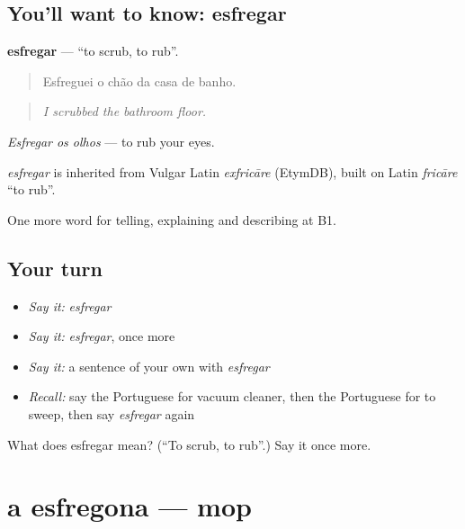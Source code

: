 \subsection*{You'll want to know: esfregar}
\textbf{esfregar} — \textquotedblleft{}to scrub, to rub\textquotedblright{}.

\begin{quote}
Esfreguei o chão da casa de banho.
\end{quote}

\begin{quote}
\emph{I scrubbed the bathroom floor.}
\end{quote}

\emph{Esfregar os olhos} — to rub your eyes.

\begin{cousinweb}
\emph{esfregar} is inherited from Vulgar Latin \emph{exfricāre} (EtymDB), built on Latin \emph{fricāre} \textquotedblleft{}to rub\textquotedblright{}.
\end{cousinweb}

\begin{grammarlens}[title={What you've built}]
One more word for telling, explaining and describing at B1.
\end{grammarlens}

\subsection*{Your turn}
\begin{itemize}
\raggedright
  \item \emph{Say it:} \emph{esfregar}
  \item \emph{Say it:} \emph{esfregar}, once more
  \item \emph{Say it:} a sentence of your own with \emph{esfregar}
  \item \emph{Recall:} say the Portuguese for vacuum cleaner, then the Portuguese for to sweep, then say \emph{esfregar} again
\end{itemize}

\begin{tcolorbox}[breakable,colback=teal!4,colframe=teal!35!black,title={Before you move on}]
What does esfregar mean? (\textquotedblleft{}To scrub, to rub\textquotedblright{}.) Say it once more.
\end{tcolorbox}
\section[a esfregona]{a esfregona — mop}


